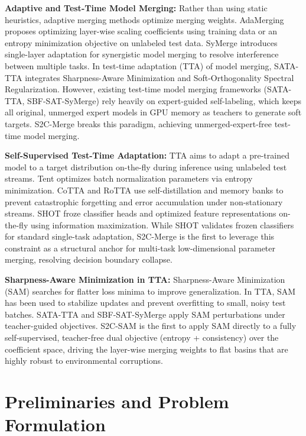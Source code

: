\documentclass{article}
\theoremstyle{plain}
\theoremstyle{definition}
\theoremstyle{remark}
\begin{document}
\textbf{Adaptive and Test-Time Model Merging:} Rather than using static heuristics, adaptive merging methods optimize merging weights. AdaMerging \cite{yang2024adamerging} proposes optimizing layer-wise scaling coefficients using training data or an entropy minimization objective on unlabeled test data. SyMerge \cite{jung2025symerge} introduces single-layer adaptation for synergistic model merging to resolve interference between multiple tasks. In test-time adaptation (TTA) of model merging, SATA-TTA \cite{papers/submission4.pdf} integrates Sharpness-Aware Minimization and Soft-Orthogonality Spectral Regularization. However, existing test-time model merging frameworks (SATA-TTA, SBF-SAT-SyMerge) rely heavily on expert-guided self-labeling, which keeps all original, unmerged expert models in GPU memory as teachers to generate soft targets. S2C-Merge breaks this paradigm, achieving unmerged-expert-free test-time model merging.

\textbf{Self-Supervised Test-Time Adaptation:} TTA aims to adapt a pre-trained model to a target distribution on-the-fly during inference using unlabeled test streams. Tent \cite{wang2021tent} optimizes batch normalization parameters via entropy minimization. CoTTA \cite{wang2022continual} and RoTTA \cite{dobler2022robust} use self-distillation and memory banks to prevent catastrophic forgetting and error accumulation under non-stationary streams. SHOT \cite{liang2020we} froze classifier heads and optimized feature representations on-the-fly using information maximization. While SHOT validates frozen classifiers for standard single-task adaptation, S2C-Merge is the first to leverage this constraint as a structural anchor for multi-task low-dimensional parameter merging, resolving decision boundary collapse.

\textbf{Sharpness-Aware Minimization in TTA:} Sharpness-Aware Minimization (SAM) \cite{foret2021sharpness, kwon2021asam, du2021efficient} searches for flatter loss minima to improve generalization. In TTA, SAM has been used to stabilize updates and prevent overfitting to small, noisy test batches. SATA-TTA and SBF-SAT-SyMerge apply SAM perturbations under teacher-guided objectives. S2C-SAM is the first to apply SAM directly to a fully self-supervised, teacher-free dual objective (entropy + consistency) over the coefficient space, driving the layer-wise merging weights to flat basins that are highly robust to environmental corruptions.

\section{Preliminaries and Problem Formulation}
\label{sec:preliminaries}
\end{document}
